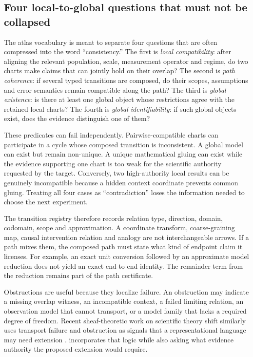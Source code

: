 \subsection{Four local-to-global questions that must not be collapsed}

The atlas vocabulary is meant to separate four questions that are often compressed into the word ``consistency.'' The first is \emph{local compatibility}: after aligning the relevant population, scale, measurement operator and regime, do two charts make claims that can jointly hold on their overlap? The second is \emph{path coherence}: if several typed transitions are composed, do their scopes, assumptions and error semantics remain compatible along the path? The third is \emph{global existence}: is there at least one global object whose restrictions agree with the retained local charts? The fourth is \emph{global identifiability}: if such global objects exist, does the evidence distinguish one of them?

These predicates can fail independently. Pairwise-compatible charts can participate in a cycle whose composed transition is inconsistent. A global model can exist but remain non-unique. A unique mathematical gluing can exist while the evidence supporting one chart is too weak for the scientific authority requested by the target. Conversely, two high-authority local results can be genuinely incompatible because a hidden context coordinate prevents common gluing. Treating all four cases as ``contradiction'' loses the information needed to choose the next experiment.

The transition registry therefore records relation type, direction, domain, codomain, scope and approximation. A coordinate transform, coarse-graining map, causal intervention relation and analogy are not interchangeable arrows. If a path mixes them, the composed path must state what kind of endpoint claim it licenses. For example, an exact unit conversion followed by an approximate model reduction does not yield an exact end-to-end identity. The remainder term from the reduction remains part of the path certificate.

Obstructions are useful because they localize failure. An obstruction may indicate a missing overlap witness, an incompatible context, a failed limiting relation, an observation model that cannot transport, or a model family that lacks a required degree of freedom. Recent sheaf-theoretic work on scientific theory shift similarly uses transport failure and obstruction as signals that a representational language may need extension \cite{olivieri2026sheaf}. \RAKL{} incorporates that logic while also asking what evidence authority the proposed extension would require.

